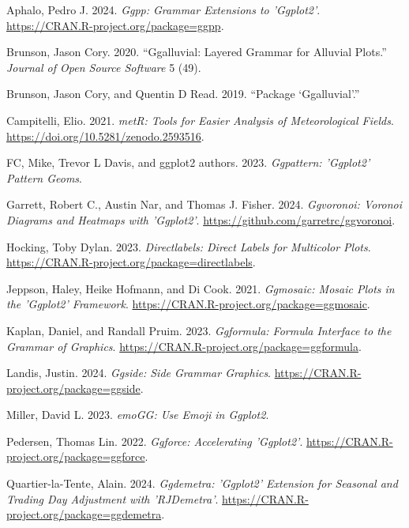 \documentclass[
  letterpaper,
  DIV=11,
  numbers=noendperiod]{scrreprt}
\newlength{\cslhangindent}
\newenvironment{CSLReferences}[2] %
 {\begin{list}{}{%
  \setlength{\itemindent}{0pt}
  \setlength{\leftmargin}{0pt}
  \setlength{\parsep}{0pt}
  \ifodd #1
   \setlength{\leftmargin}{\cslhangindent}
   \setlength{\itemindent}{-1\cslhangindent}
  \fi
  \setlength{\itemsep}{#2\baselineskip}}}
 {\end{list}}
\begin{document}
\label{refs}
\begin{CSLReferences}{1}{0}
Aphalo, Pedro J. 2024. \emph{Ggpp: Grammar Extensions to 'Ggplot2'}.
\url{https://CRAN.R-project.org/package=ggpp}.

Brunson, Jason Cory. 2020. {``Ggalluvial: Layered Grammar for Alluvial
Plots.''} \emph{Journal of Open Source Software} 5 (49).

Brunson, Jason Cory, and Quentin D Read. 2019. {``Package
{`Ggalluvial'}.''}

Campitelli, Elio. 2021. \emph{metR: Tools for Easier Analysis of
Meteorological Fields}. \url{https://doi.org/10.5281/zenodo.2593516}.

FC, Mike, Trevor L Davis, and ggplot2 authors. 2023. \emph{Ggpattern:
'Ggplot2' Pattern Geoms}.

Garrett, Robert C., Austin Nar, and Thomas J. Fisher. 2024.
\emph{Ggvoronoi: Voronoi Diagrams and Heatmaps with 'Ggplot2'}.
\url{https://github.com/garretrc/ggvoronoi}.

Hocking, Toby Dylan. 2023. \emph{Directlabels: Direct Labels for
Multicolor Plots}.
\url{https://CRAN.R-project.org/package=directlabels}.

Jeppson, Haley, Heike Hofmann, and Di Cook. 2021. \emph{Ggmosaic: Mosaic
Plots in the 'Ggplot2' Framework}.
\url{https://CRAN.R-project.org/package=ggmosaic}.

Kaplan, Daniel, and Randall Pruim. 2023. \emph{Ggformula: Formula
Interface to the Grammar of Graphics}.
\url{https://CRAN.R-project.org/package=ggformula}.

Landis, Justin. 2024. \emph{Ggside: Side Grammar Graphics}.
\url{https://CRAN.R-project.org/package=ggside}.

Miller, David L. 2023. \emph{emoGG: Use Emoji in Ggplot2}.

Pedersen, Thomas Lin. 2022. \emph{Ggforce: Accelerating 'Ggplot2'}.
\url{https://CRAN.R-project.org/package=ggforce}.

Quartier-la-Tente, Alain. 2024. \emph{Ggdemetra: 'Ggplot2' Extension for
Seasonal and Trading Day Adjustment with 'RJDemetra'}.
\url{https://CRAN.R-project.org/package=ggdemetra}.


\end{CSLReferences}
\end{document}
